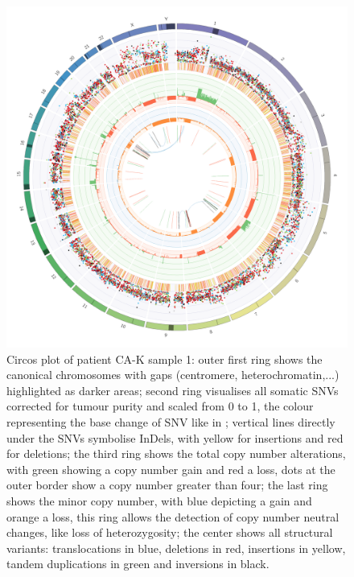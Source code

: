 \begin{figure}[ht]
\centering
\includegraphics[width=.99\linewidth]{Figures/CASCADE/CA82/CA82-1.circos.png}
\caption[Circos plot of patient CA-K sample 1]{Circos plot of patient CA-K sample 1: outer first ring shows the canonical chromosomes with gaps (centromere, heterochromatin,...) highlighted as darker areas; second ring visualises all somatic SNVs corrected for tumour purity and scaled from 0 to 1, the colour representing the base change of SNV like in \protect\textcite{Alexandrov2013}; vertical lines directly under the SNVs symbolise InDels, with yellow for insertions and red for deletions; the third ring shows the total copy number alterations, with green showing a copy number gain and red a loss, dots at the outer border show a copy number greater than four; the last ring shows the minor copy number, with blue depicting a gain and orange a loss, this ring allows the detection of copy number neutral changes, like loss of heterozygosity; the center shows all structural variants: translocations in blue, deletions in red, insertions in yellow, tandem duplications in green and inversions in black.} \label{fig:ca82.1circos}
\end{figure}




